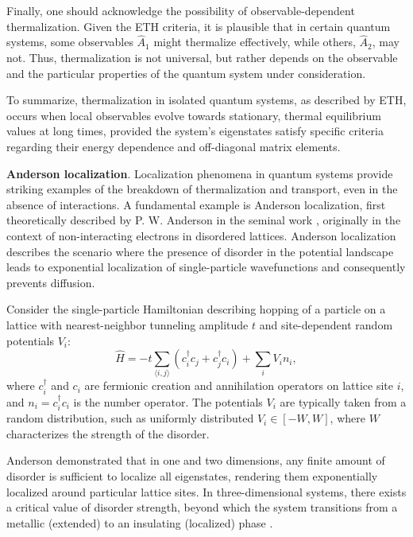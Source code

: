 Finally, one should acknowledge the possibility of observable-dependent thermalization. Given the ETH criteria, it is plausible that in certain quantum systems, some observables $\hat{A}_1$ might thermalize effectively, while others, $\hat{A}_2$, may not. Thus, thermalization is not universal, but rather depends on the observable and the particular properties of the quantum system under consideration.

To summarize, thermalization in isolated quantum systems, as described by ETH, occurs when local observables evolve towards stationary, thermal equilibrium values at long times, provided the system's eigenstates satisfy specific criteria regarding their energy dependence and off-diagonal matrix elements.


\textbf{Anderson localization}.
Localization phenomena in quantum systems provide striking examples of the breakdown of thermalization and transport, even in the absence of interactions. A fundamental example is Anderson localization, first theoretically described by P. W. Anderson in the seminal work \cite{anderson_absence_1958}, originally in the context of non-interacting electrons in disordered lattices. Anderson localization describes the scenario where the presence of disorder in the potential landscape leads to exponential localization of single-particle wavefunctions and consequently prevents diffusion.

Consider the single-particle Hamiltonian describing hopping of a particle on a lattice with nearest-neighbor tunneling amplitude $t$ and site-dependent random potentials $V_i$:
\begin{equation*}
\hat{H} = -t \sum_{\langle i,j\rangle} (c_i^\dagger c_j + c_j^\dagger c_i) + \sum_{i} V_i n_i,
\label{eq:anderson_ham}
\end{equation*}
where $c_i^\dagger$ and $c_i$ are fermionic creation and annihilation operators on lattice site $i$, and $n_i = c_i^\dagger c_i$ is the number operator. The potentials $V_i$ are typically taken from a random distribution, such as uniformly distributed $V_i \in [-W, W]$, where $W$ characterizes the strength of the disorder.

Anderson demonstrated that in one and two dimensions, any finite amount of disorder is sufficient to localize all eigenstates, rendering them exponentially localized around particular lattice sites. In three-dimensional systems, there exists a critical value of disorder strength, beyond which the system transitions from a metallic (extended) to an insulating (localized) phase \cite{abrahams_50_2010}.

